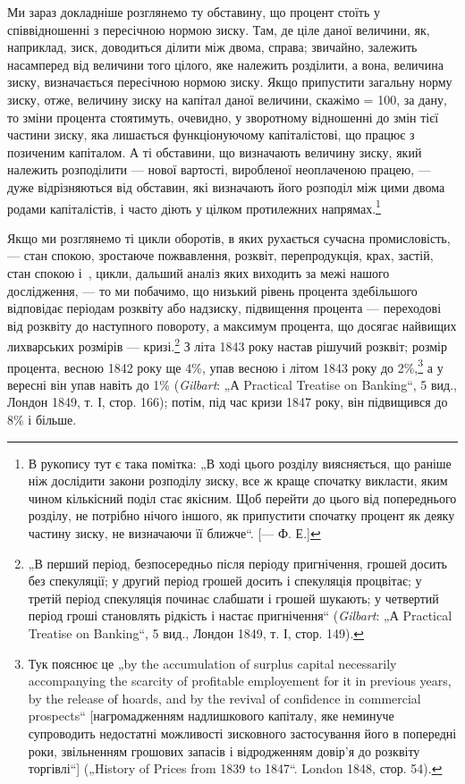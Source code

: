 
Ми зараз докладніше розглянемо ту обставину, що процент
стоїть у співвідношенні з пересічною нормою зиску. Там, де
ціле даної величини, як, наприклад, зиск, доводиться ділити між
двома, справа; звичайно, залежить насамперед від величини того
цілого, яке належить розділити, а вона, величина зиску, визначається
пересічною нормою зиску. Якщо припустити загальну
норму зиску, отже, величину зиску на капітал даної величини,
скажімо = 100, за дану, то зміни процента стоятимуть, очевидно,
у зворотному відношенні до змін тієї частини зиску, яка лишається
функціонуючому капіталістові, що працює з позиченим
капіталом. А ті обставини, що визначають величину зиску, який
належить розподілити — нової вартості, виробленої неоплаченою
працею, — дуже відрізняються від обставин, які визначають його
розподіл між цими двома родами капіталістів, і часто діють у цілком
протилежних напрямах.\footnote{
В рукопису тут є така помітка: „В ході цього розділу виясняється, що
раніше ніж дослідити закони розподілу зиску, все ж краще спочатку викласти,
яким чином кількісний поділ стає якісним. Щоб перейти до цього від попереднього
розділу, не потрібно нічого іншого, як припустити спочатку процент як
деяку частину зиску, не визначаючи її ближче“. [— Ф. Е.]
}

Якщо ми розглянемо ті цикли оборотів, в яких рухається сучасна
промисловість, — стан спокою, зростаюче пожвавлення, розквіт,
перепродукція, крах, застій, стан спокою і~, цикли,
дальший аналіз яких виходить за межі нашого дослідження, —
то ми побачимо, що низький рівень процента здебільшого відповідає
періодам розквіту або надзиску, підвищення процента —
переходові від розквіту до наступного повороту, а максимум
процента, що досягає найвищих лихварських розмірів — кризі.\footnote{
„В перший період, безпосередньо після періоду пригнічення, грошей
досить без спекуляції; у другий період грошей досить і спекуляція процвітає;
у третій період спекуляція починає слабшати і грошей шукають; у четвертий
період гроші становлять рідкість і настає пригнічення“ (\emph{Gilbart}: „А Practical
Treatise on Banking“, 5 вид., Лондон 1849, т. І, стор. 149).
}
З літа 1843 року настав рішучий розквіт; розмір процента, весною
1842 року ще 4\%, упав весною і літом 1843 року до 2\%,\footnote{
Тук пояснює це „by the accumulation of surplus capital necessarily accompanying
the scarcity of profitable employement for it in previous years, by the release
of hoards, and by the revival of confidence in commercial prospects“ [нагромадженням
надлишкового капіталу, яке неминуче супроводить недостатні
можливості зисковного застосування його в попередні роки, звільненням грошових
запасів і відродженням довір’я до розквіту торгівлі“] („History of
Prices from 1839 to 1847“. London 1848, стор. 54).
}
а у вересні він упав навіть до 1\% (\emph{Gilbart}: „А Practical Treatise
on Banking“, 5 вид., Лондон 1849, т. І, стор. 166); потім, під час
кризи 1847 року, він підвищився до 8\% і більше.

